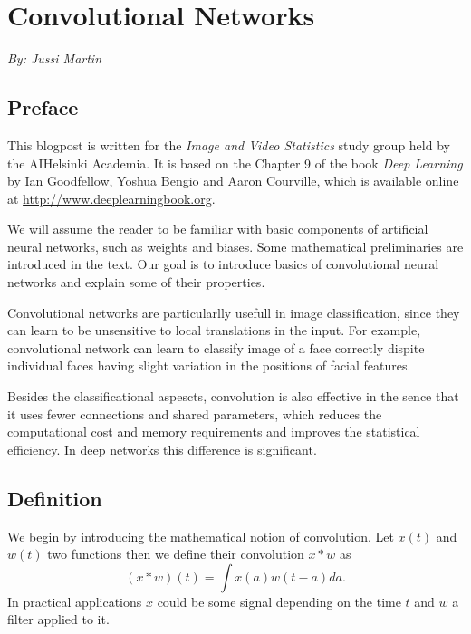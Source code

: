 \documentclass[]{article}
\begin{document}
\section{Convolutional Networks}
\begin{center}
  \emph{By: Jussi Martin}
\end{center}
\subsection{Preface}
This blogpost is written for the \emph{Image and Video Statistics} study group
held by the AIHelsinki Academia. It is based on the Chapter 9 of the book
\emph{Deep Learning} by Ian Goodfellow, Yoshua Bengio and Aaron Courville, which
is
available
online at \url{http://www.deeplearningbook.org}.

We will assume the reader to be familiar with basic components of artificial
neural networks, such as weights and biases. Some mathematical preliminaries are
introduced in the text. Our goal is to introduce basics of convolutional neural
networks and explain some of their properties.

Convolutional networks are particularlly usefull in image classification, since
they can learn to be unsensitive to local translations in the input. For example,
convolutional network can learn to classify image of a face correctly dispite
individual faces having slight variation in the positions of facial features.

Besides the classificational aspescts, convolution is also effective in the sence
that it uses fewer connections and shared parameters, which reduces the
computational cost and memory requirements and improves the statistical efficiency.
In deep networks this difference is significant.



\subsection{Definition}
We begin by introducing the mathematical notion of convolution. Let $x(t)$ and $w(t)$
two functions then we define their convolution $x * w$ as
\[
(x * w)(t) = \int x(a)w(t - a)da.
\]
In practical applications $x$ could be some signal depending on the time $t$ and
$w$ a filter applied to it.
\end{document}

